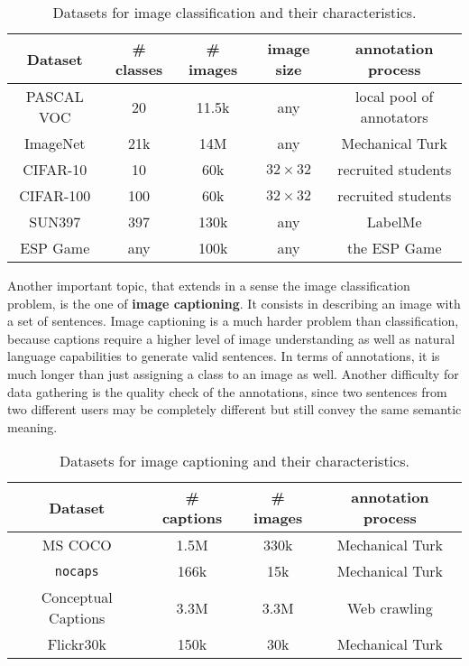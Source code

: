 \vspace{0.5cm}
\begin{table}
	\centering
	\caption{Datasets for image classification and their characteristics.}
	\begin{tabular}{|c|c|c|c|c|}
		\hline
		Dataset & \# classes & \# images & image size & annotation process \\
		\hline
		PASCAL VOC \cite{Everingham10} & 20 & 11.5k & any & local pool of annotators \\
		ImageNet \cite{ILSVRC15} & 21k & 14M & any & Mechanical Turk \\
		CIFAR-10 & 10 & 60k & $32 \times 32$ & recruited students \\
		CIFAR-100 & 100 & 60k & $32 \times 32$ & recruited students \\
		SUN397 & 397 & 130k & any & LabelMe \\
		ESP Game & any & 100k & any & the ESP Game \\
		\hline
	\end{tabular}
	\label{tab:classification_ds}
\end{table}
\vspace{0.5cm}


Another important topic, that extends in a sense the image classification problem, is the one of \textbf{image captioning}. It consists in describing an image with a set of sentences. Image captioning is a much harder problem than classification, because captions require a higher level of image understanding as well as natural language capabilities to generate valid sentences. In terms of annotations, it is much longer than just assigning a class to an image as well. Another difficulty for data gathering is the quality check of the annotations, since two sentences from two different users may be completely different but still convey the same semantic meaning. 

\vspace{0.5cm}

\begin{table}
	\centering
	\caption{Datasets for image captioning and their characteristics.}
	\begin{tabular}{|c|c|c|c|}
		\hline
		Dataset & \# captions & \# images & annotation process \\
		\hline
		MS COCO \cite{chen2015microsoft} & 1.5M & 330k & Mechanical Turk \\
		\texttt{nocaps} \cite{agrawal2019nocaps} & 166k & 15k & Mechanical Turk \\
		Conceptual Captions \cite{sharma-etal-2018-conceptual} & 3.3M & 3.3M & Web crawling \\
		Flickr30k \cite{flickr30k} & 150k & 30k & Mechanical Turk \\
		\hline
	\end{tabular}
	\label{tab:caption_ds}
\end{table}
\vspace{0.5cm}


